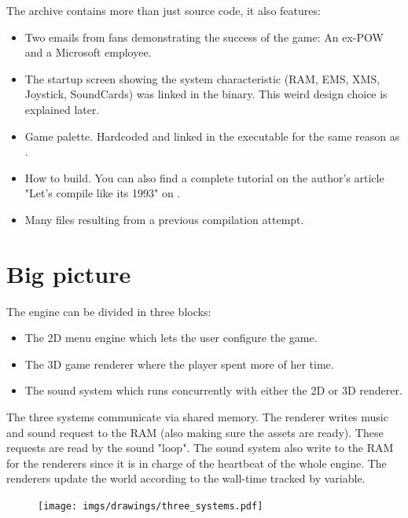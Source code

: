 \documentclass[book.tex]{subfiles}
\begin{document}
The archive contains more than just source code, it also features:
\begin{itemize}
\item {} Two emails from fans demonstrating the success of the game: An ex-POW and a Microsoft employee.
\item {} The startup screen showing the system characteristic (RAM, EMS, XMS, Joystick, SoundCards) was linked in the binary. This weird design choice is explained later.
\item {} Game palette. Hardcoded and linked in the executable for the same reason as .
\item {} How to build. You can also find a complete tutorial on the author's article "Let's compile like its 1993" on .
\item Many files resulting from a previous compilation attempt.
\end{itemize}







\section{Big picture}
The engine can be divided in three blocks:
\begin{itemize}
\item The 2D menu engine which lets the user configure the game.
\item The 3D game renderer where the player spent more of her time.
\item The sound system which runs concurrently with either the 2D or 3D renderer. 
\end{itemize}
The three systems communicate via shared memory. The renderer writes music and sound request to the RAM (also making sure the assets are ready). These requests are read by the sound "loop". The sound system also write to the RAM for the renderers since it is in charge of the heartbeat of the whole engine. The renderers update the world according to the wall-time tracked by  variable.
\par
\begin{figure}[H]
\centering
 \texttt{[image: imgs/drawings/three\_systems.pdf]}
 \end{figure}
 \par

 
\end{document}
